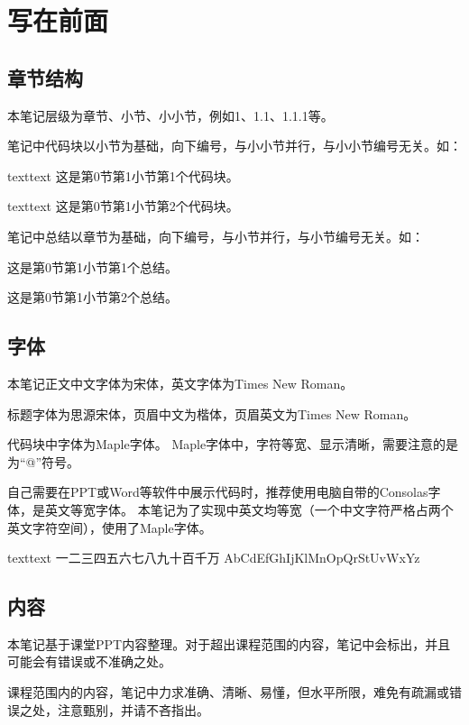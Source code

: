\section{写在前面}

\subsection{章节结构}
本笔记层级为章节、小节、小小节，例如1、1.1、1.1.1等。

笔记中代码块以小节为基础，向下编号，与小小节并行，与小小节编号无关。如：
\begin{envcode}{text}{text}
这是第0节第1小节第1个代码块。
\end{envcode}
\begin{envcode}{text}{text}
这是第0节第1小节第2个代码块。
\end{envcode}

笔记中总结以章节为基础，向下编号，与小节并行，与小节编号无关。如：
\begin{zj}
这是第0节第1小节第1个总结。
\end{zj}
\begin{zj}
这是第0节第1小节第2个总结。
\end{zj}

\subsection{字体}

本笔记正文中文字体为宋体，英文字体为Times New Roman。

标题字体为思源宋体，页眉中文为楷体，页眉英文为Times New Roman。

代码块中字体为Maple字体。
Maple字体中，字符等宽、显示清晰，需要注意的是为“@”符号。

自己需要在PPT或Word等软件中展示代码时，推荐使用电脑自带的Consolas字体，是英文等宽字体。
本笔记为了实现中英文均等宽（一个中文字符严格占两个英文字符空间），使用了Maple字体。
\begin{envcode}{text}{text}
一二三四五六七八九十百千万
AbCdEfGhIjKlMnOpQrStUvWxYz
\end{envcode}

\subsection{内容}
本笔记基于课堂PPT内容整理。对于超出课程范围的内容，笔记中会标出，并且可能会有错误或不准确之处。

课程范围内的内容，笔记中力求准确、清晰、易懂，但水平所限，难免有疏漏或错误之处，注意甄别，并请不吝指出。